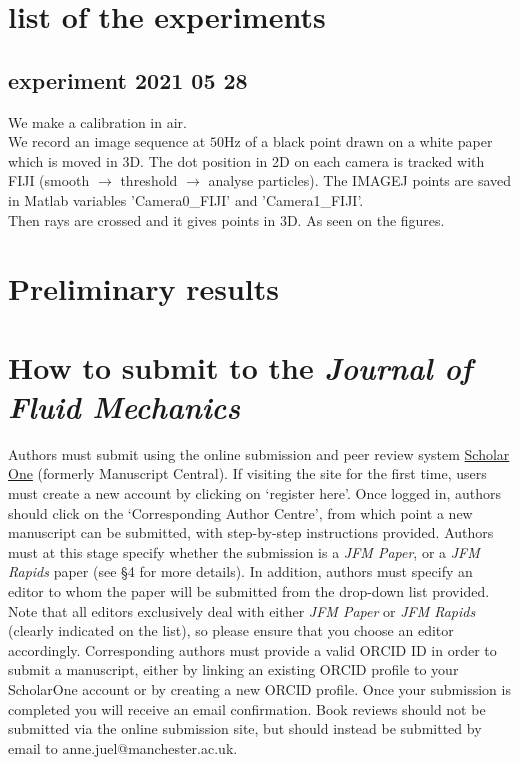 \documentclass[lineno]{jfm}
\begin{document}
\section{list of the experiments}

\subsection{experiment 2021 05 28}

We make a calibration in air.\\
We record an image sequence at $50$Hz of a black point drawn on a white paper which is moved in $3$D. The dot position in 2D on each camera is tracked with FIJI (smooth $\rightarrow$ threshold $\rightarrow$ analyse particles). The IMAGEJ points are saved in Matlab variables 'Camera0\_FIJI' and 'Camera1\_FIJI'. \\
Then rays are crossed and it gives points in 3D. As seen on the figures.

\section{Preliminary results}




\section{How to submit to the \emph{Journal of Fluid Mechanics}}
\label{sec:intro}

 Authors must submit using the online submission and peer review system \href{https://mc.manuscriptcentral.com/jfm} {Scholar One} (formerly Manuscript Central). If visiting the site for the first time, users must create a new account by clicking on `register here'. Once logged in, authors should click on the `Corresponding Author Centre', from which point a new manuscript can be submitted, with step-by-step instructions provided. Authors must at this stage specify whether the submission is a {\it JFM Paper}, or a {\it JFM Rapids} paper (see \S4 for more details). In addition, authors must specify an editor to whom the paper will be submitted from the drop-down list provided. Note that all editors exclusively deal with either {\it JFM Paper} or {\it JFM Rapids} (clearly indicated on the list), so please ensure that you choose an editor accordingly. Corresponding authors must provide a valid ORCID ID in order to submit a manuscript, either by linking an existing ORCID profile to your ScholarOne account or by creating a new ORCID profile. Once your submission is completed you will receive an email confirmation. Book reviews should not be submitted via the online submission site, but should instead be submitted by email to anne.juel@manchester.ac.uk.
%
\end{document}
